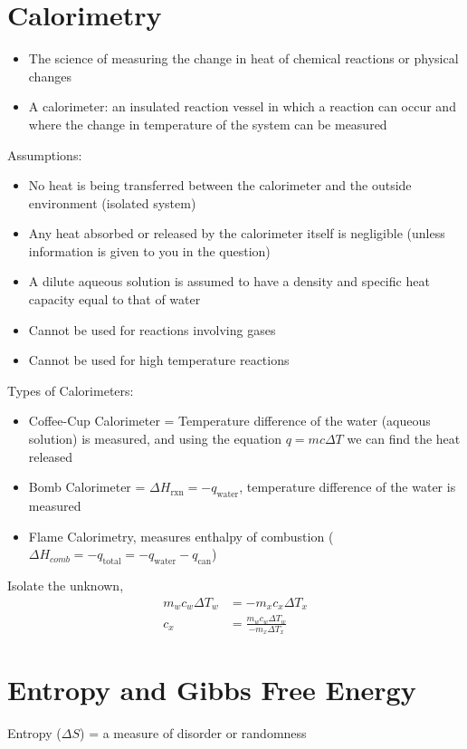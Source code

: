 \documentclass[11pt]{article}
\begin{document}
\pagebreak
\section{Calorimetry}
\begin{itemize}
    \item The science of measuring the change in heat of chemical reactions or physical changes
    \item A calorimeter: an insulated reaction vessel in which a reaction can occur and where the change in temperature of the system can be measured
\end{itemize}
Assumptions:
\begin{itemize}
    \item No heat is being transferred between the calorimeter and the outside environment (isolated system)
    \item Any heat absorbed or released by the calorimeter itself is negligible (unless information is given to you in the question)
    \item A dilute aqueous solution is assumed to have a density and specific heat capacity equal to that of water
    \item Cannot be used for reactions involving gases
    \item Cannot be used for high temperature reactions
\end{itemize}
Types of Calorimeters:
\begin{itemize}
    \item Coffee-Cup Calorimeter = Temperature difference of the water (aqueous solution) is measured, and using the equation $q=mc\Delta T$ we can find the heat released
    \item Bomb Calorimeter = $\Delta H_{\text{rxn}} = - q_\text{water}$, temperature difference of the water is measured
    \item Flame Calorimetry, measures enthalpy of combustion ($\Delta H_{comb} = - q_\text{total} = - q_\text{water} - q_\text{can}$)
\end{itemize}
Isolate the unknown,
\begin{align}
    m_w c_w \Delta T_w &= - m_x c_x \Delta T_x\\
    c_x &= \frac{m_w c_w \Delta T_w }{- m_x \Delta T_x}
\end{align}
\pagebreak

\section{Entropy and Gibbs Free Energy}
Entropy ($\Delta S$) = a measure of disorder or randomness
\end{document}
